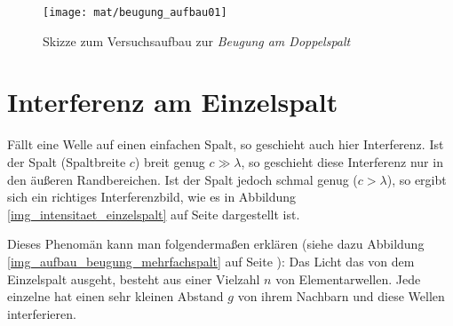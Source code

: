  



\begin{figure}
 \centering
 \texttt{[image: mat/beugung\_aufbau01]}
 	\caption{Skizze zum Versuchsaufbau zur \emph{Beugung am Doppelspalt}}
 		\label{img_beugungamdoppelspalt}
\end{figure}











	\section{Interferenz am Einzelspalt}
	\label{kap_interferenz_einzelspalt}
	
Fällt eine Welle auf einen einfachen Spalt, so geschieht auch hier Interferenz. Ist der Spalt (Spaltbreite \(c\)) breit genug \(c \gg \lambda\), so geschieht diese Interferenz nur in den äußeren Randbereichen. Ist der Spalt jedoch schmal genug (\(c > \lambda\)), so ergibt sich ein richtiges Interferenzbild, wie es in Abbildung \ref{img_intensitaet_einzelspalt} auf Seite \pageref{img_intensitaet_einzelspalt} dargestellt ist.

Dieses Phenomän kann man folgendermaßen erklären (siehe dazu Abbildung \ref{img_aufbau_beugung_mehrfachspalt} auf Seite \pageref{img_aufbau_beugung_mehrfachspalt}): Das Licht das von dem Einzelspalt ausgeht, besteht aus einer Vielzahl \(n\) von Elementarwellen. Jede einzelne hat einen sehr kleinen Abstand \(g\) von ihrem Nachbarn und diese Wellen interferieren.

